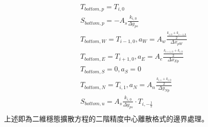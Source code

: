 \documentclass[12pt]{article}
\begin{document}
\begin{equation}
    \begin{split}
        &T_{bottom,p} = T_{i,0} \\
        &S_{bottom,p} = -A_{s}\frac{k_{i,0}}{\Delta y_{ps}}\\
        &T_{bottom,W} = T_{i-1,0}, a_{W} = A_{w}\frac{\frac{k_{i,0}+k_{i-1,0}}{2}}{\Delta x_{pW}}\\
        &T_{bottom,E} = T_{i+1,0} , a_{E} = A_{e}\frac{\frac{k_{i+1,0}+k_{i,0}}{2}}{\Delta x_{Ep}}\\
        &T_{bottom,S} = 0, a_{S} =0\\
        &T_{bottom,N} = T_{i,1} ,a_{N} = A_{n}\frac{\frac{k_{i,1}+k_{i,0}}{2}}{\Delta y_{Np}}\\
        &S_{bottom,u} =A_{s}\frac{k_{i,0}}{\Delta y_{ps}}\cdot T_{i,-\frac{1}{2}}\\
    \end{split}
\end{equation}
上述即為二維穩態擴散方程的二階精度中心離散格式的邊界處理。
\end{document}
